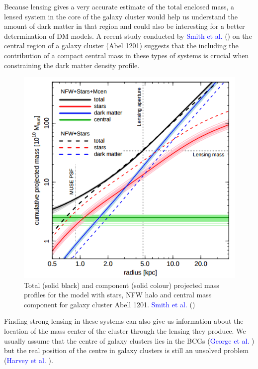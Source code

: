 Because lensing gives a very accurate estimate of the total enclosed mass, a lensed system in the core of the galaxy cluster would help us understand the amount of dark matter in that region and could also be interesting for a better determination of DM models. A recent study conducted by \textcolor{blue}{Smith et al.} (\citeyear{Reference34}) on the central region of a galaxy cluster (Abel 1201) suggests that the including the contribution of a compact central mass in these types of systems is crucial when constraining the dark matter density profile.

\begin{figure}[H]
\centering
\includegraphics[width=12cm]{images/smith.png}
\caption[Projected mass model for Abell 1201]{Total (solid black) and component (solid colour) projected mass profiles for the model with stars, NFW halo and central mass component for galaxy cluster Abell 1201. \textcolor{blue}{Smith et al.} (\citeyear{Reference34})}
\end{figure}

Finding strong lensing in these systems can also give us information about the location of the mass center of the cluster through the lensing they produce. We usually assume that the centre of galaxy clusters lies in the BCGs (\textcolor{blue}{George et al.} \citeyear{Reference18}) but the real position of the centre in galaxy clusters is still an unsolved problem (\textcolor{blue}{Harvey et al.} \citeyear{Reference13}). 

